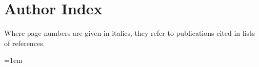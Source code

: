 
\clearpage
\section*{Author Index}

\begin{center}
Where page numbers are given in italics, they refer to publications cited in
lists of references.
\end{center}

\begingroup
\small
\setlength{\columnsep}{2.2em}
\setlength{\parindent}{0pt}
\setlength{\parskip}{0pt}
\emergencystretch=1em
\raggedright
\raggedcolumns

\newcommand{\aidxbib}[1]{\textit{#1}}
\newcommand{\aidxentry}[2]{%
  \par\noindent\hangindent=1.75em\hangafter=1
  \mbox{#1}\nobreakspace #2\par
}
\newcommand{\aidxgroup}{\par\addvspace{0.65\baselineskip}}

\vspace{1.25\baselineskip}

